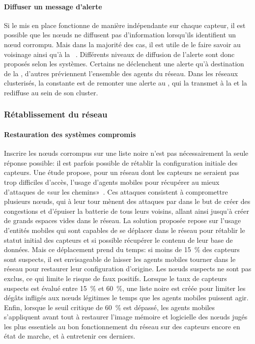         \paragraph{Diffuser un message d'alerte}
Si le \ids mis en place fonctionne de manière indépendante sur chaque capteur, il est possible que les nœuds ne diffusent pas d'information lorsqu'ils identifient un nœud corrompu.
Mais dans la majorité des cas, il est utile de le faire savoir au voisinage ainsi qu'à la \sdb~\cite{BMS13}.
Différents niveaux de diffusion de l'alerte sont donc proposés selon les systèmes.
Certains ne déclenchent une alerte qu'à destination de la \sdb, d'autres préviennent l'ensemble des agents du réseau.
Dans les réseaux clusterisés, la constante est de remonter une alerte au \ch, qui la transmet à la \sdb et la rediffuse au sein de son cluster.

    \subsubsection{Rétablissement du réseau}
        \paragraph{Restauration des systèmes compromis}
Inscrire les nœuds corrompus sur une liste noire n'est pas nécessairement la seule réponse possible: il est parfois possible de rétablir la configuration initiale des capteurs.
Une étude propose, pour un réseau dont les capteurs ne seraient pas trop difficiles d'accès, l'usage d'agents mobiles pour récupérer au mieux d'attaques de \dds «sur les chemins»~\cite{LB09}.
Ces attaques consistent à compromettre plusieurs nœuds, qui à leur tour mènent des attaques par \deluge dans le but de créer des congestions et d'épuiser la batterie de tous leurs voisins, allant ainsi jusqu'à créer de grands espaces vides dans le réseau.
La solution proposée repose sur l'usage d'entités mobiles qui sont capables de se déplacer dans le réseau pour rétablir le statut initial des capteurs et si possible récupérer le contenu de leur base de données.
Mais ce déplacement prend du temps: si moins de 15~\% des capteurs sont suspects, il est envisageable de laisser les agents mobiles tourner dans le réseau pour restaurer leur configuration d'origine.
Les nœuds suspects ne sont pas exclus, ce qui limite le risque de faux positifs.
Lorsque le taux de capteurs suspects est évalué entre 15~\% et 60~\%, une liste noire est créée pour limiter les dégâts infligés aux nœuds légitimes le temps que les agents mobiles puissent agir.
Enfin, lorsque le seuil critique de 60~\% est dépassé, les agents mobiles s'appliquent avant tout à restaurer l'image mémoire et logicielle des nœuds jugés les plus essentiels au bon fonctionnement du réseau sur des capteurs encore en état de marche, et à entretenir ces derniers.

